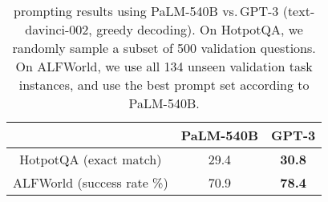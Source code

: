 \begin{table}[ht]
    \centering
\begin{tabular}{c | cc}
\toprule
 & PaLM-540B & GPT-3 \\ \midrule
HotpotQA (exact match) & 29.4 & \textbf{30.8} \\
ALFWorld (success rate \%) & 70.9 & \textbf{78.4} \\ 
\bottomrule
\end{tabular}%
    \caption{\model{} prompting results using PaLM-540B vs.\,GPT-3 (text-davinci-002, greedy decoding). On HotpotQA, we randomly sample a subset of 500 validation questions. On ALFWorld, we use all 134 unseen validation task instances, and use the best prompt set according to PaLM-540B.}
    \label{tab:gpt3}
\end{table}